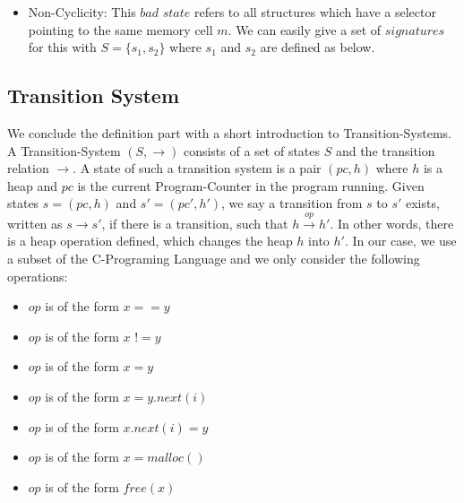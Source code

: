 \begin{itemize}
	
	\item Non-Cyclicity: This $bad$ $state$ refers to all structures which have a selector pointing to the same memory cell $m$.
		We can easily give a set of $signatures$ for this with $S = \{s_1, s_2\}$ where $s_1$ and $s_2$ are defined as below.

	\begin{center}
		\qquad
	\end{center}
\end{itemize}

\subsection{Transition System}
We conclude the definition part with a short introduction to Transition-Systems. A Transition-System $(S, \longrightarrow)$ consists
of a set of states $S$ and the transition relation $\longrightarrow$. A state of such a transition system is a pair $(pc, h)$ where
$h$ is a heap and $pc$ is the current Program-Counter in the program running. Given states $s = (pc, h)$ and $s' = (pc', h')$, we 
say a transition from $s$ to $s'$ exists, written as $s \longrightarrow s'$, if there is a transition, such that 
$h \xrightarrow{op} h'$. In other words, there is a heap operation defined, which changes the heap $h$ into $h'$. In our case,
we use a subset of the C-Programing Language and we only consider the following operations:
\begin{itemize}
	\item $op$ is of the form $x == y$
	\item $op$ is of the form $x$ $!= y$
	\item $op$ is of the form $x = y$
	\item $op$ is of the form $x = y.next(i)$
	\item $op$ is of the form $x.next(i) = y$
	\item $op$ is of the form $x = malloc()$
	\item $op$ is of the form $free(x)$
\end{itemize}

